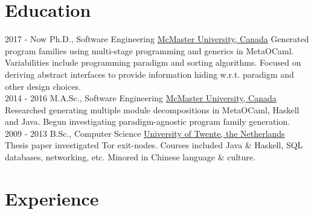 \documentclass[letterpaper]{twentysecondcv} %
\begin{document}
\makeprofile %



\section{Education}

\begin{twenty} %
  \twentyitem
    {2017 - Now}
    {}
    {Ph.D., Software Engineering}%
    {\href{https://www.mcmaster.ca/}{McMaster University, Canada}}
    {}
    {Generated program families using multi-stage programming and generics in MetaOCaml. Variabilities include programming paradigm and sorting algorithms. Focused on deriving abstract interfaces to provide information hiding w.r.t. paradigm and other design choices.}
    \\
  \twentyitem
    {2014 - 2016}
    {}
    {M.A.Sc., Software Engineering}%
    {\href{https://www.mcmaster.ca/}{McMaster University, Canada}}
    {}
    {Researched generating multiple module decompositions in MetaOCaml, Haskell and Java. Begun investigating paradigm-agnostic program family generation.}
    \\
  \twentyitem
    {2009 - 2013}
    {}
    {B.Sc., Computer Science}%
    {\href{https://www.utwente.nl/}{University of Twente, the Netherlands}}
    {}
    {Thesis paper investigated Tor exit-nodes. Courses included Java \& Haskell, SQL databases, networking, etc. Minored in Chinese language \& culture.}
\end{twenty}
\vspace{-.5em}


\section{Experience}
\end{document}
